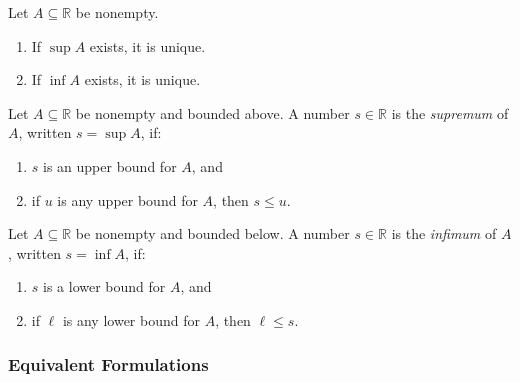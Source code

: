 \begin{proposition}
\label{prop:sup-unique}
Let $A \subseteq \mathbb{R}$ be nonempty.

\begin{enumerate}
\item If $\sup A$ exists, it is unique.
\item If $\inf A$ exists, it is unique.
\end{enumerate}
\end{proposition}


\begin{tcolorbox}[colback=propbox, colframe=propborder, arc=2pt,
  left=6pt, right=6pt, top=4pt, bottom=4pt,
  title={\small\textbf{Definition (Supremum (Least Upper Bound))}},
  fonttitle=\small\bfseries]
Let $A \subseteq \mathbb{R}$ be nonempty and bounded above.
A number $s \in \mathbb{R}$ is the \emph{supremum} of $A$,
written $s = \sup A$, if:
\begin{enumerate}
  \item $s$ is an upper bound for $A$, and
  \item if $u$ is any upper bound for $A$, then $s \le u$.
\end{enumerate}
\end{tcolorbox}

\begin{tcolorbox}[colback=propbox, colframe=propborder, arc=2pt,
  left=6pt, right=6pt, top=4pt, bottom=4pt,
  title={\small\textbf{Definition (Infimum (Greatest Lower Bound))}},
  fonttitle=\small\bfseries]
Let $A \subseteq \mathbb{R}$ be nonempty and bounded below.
A number $s \in \mathbb{R}$ is the \emph{infimum} of $A$,
written $s = \inf A$, if:
\begin{enumerate}
  \item $s$ is a lower bound for $A$, and
  \item if $\ell$ is any lower bound for $A$, then $\ell \le s$.
\end{enumerate}
\end{tcolorbox}


\subsubsection{Equivalent Formulations}

